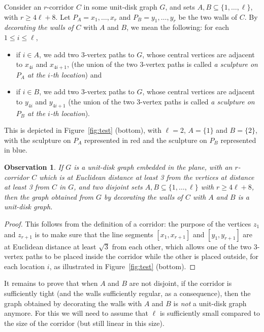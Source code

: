 \documentclass[a4paper,reqno, 12pt]{amsart}
\newtheorem{observation}[theorem]{Observation}
\begin{document}
Consider an $r$-corridor $C$ in some unit-disk graph $G$, and
sets $A,B\subseteq \{1,\ldots,\ell\}$, with $r\ge 4\ell+8$. Let $P_A=x_1,\ldots,x_r$ and $P_B=y_1,\ldots,y_r$
be the two walls of $C$. By \emph{decorating the walls of $C$} with $A$ and $B$, we
mean the following: for each $1\le i\le \ell$,
\begin{itemize}
\item if $i\in A$, we add two 3-vertex paths to $G$, whose central
  vertices are adjacent to $x_{4i}$ and $x_{4i+1}$, (the union of the
  two 3-vertex paths is called \emph{a sculpture on $P_A$ at the
    $i$-th location}) and
  \item if $i\in B$, we add two 3-vertex paths to $G$, whose central
  vertices are adjacent to $y_{4i}$ and $y_{4i+1}$ (the union of the
  two 3-vertex paths is called \emph{a sculpture on $P_B$ at the
    $i$-th location}).
\end{itemize}
This is depicted in Figure~\ref{fig:test} (bottom), with $\ell=2$, $A=\{1\}$ and
$B=\{2\}$, with the sculpture on $P_A$ represented in red and the
sculpture on $P_B$ represented in blue.

\begin{observation}\label{obs:deco}
If $G$ is a unit-disk graph embedded in the plane, with an $r$-corridor
$C$ which is at Euclidean distance at least 3 from the vertices at
distance at least 3 from $C$ in $G$, and two disjoint sets
$A,B\subseteq\{1,\ldots,\ell\}$ with $r\ge 4\ell+8$, then the graph obtained from $G$ by
decorating the walls of $C$ with $A$ and $B$ is a unit-disk graph.
\end{observation}

\begin{proof}
This follows from the definition of a corridor: the purpose of the vertices $z_1$ and
$z_{r+1}$ is to make sure that the line segments $[x_1,x_{r+1}]$ and
$[y_1,y_{r+1}]$ are at Euclidean distance at least $\sqrt{3}$ from
each other, which allows one of the two 3-vertex paths to be placed
inside the corridor while the other is placed outside, for each
location $i$, as illustrated in Figure~\ref{fig:test} (bottom).
\end{proof}

It remains to prove that when $A$ and $B$ are not disjoint, if the corridor is
sufficiently tight (and the walls sufficiently regular, as a
consequence), then the graph obtained by decorating the walls with $A$
and $B$ is \emph{not} a unit-disk graph anymore. For this we will
need to assume that $\ell$ is sufficiently small compared to the size
of the corridor (but
still linear in this size).
\end{document}
